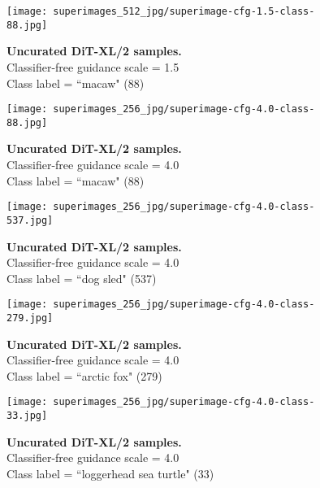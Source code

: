 \documentclass[10pt,twocolumn,letterpaper]{article}
\begin{document}
\begin{figure}\centering
\texttt{[image: superimages\_512\_jpg/superimage-cfg-1.5-class-88.jpg]}
\caption{\textbf{Uncurated  DiT-XL/2 samples.} \\Classifier-free guidance scale = 1.5\\Class label = ``macaw" (88)}\vspace{-2mm}
\label{fig:samples512_12}
\end{figure}


\clearpage
\pagestyle{fancy}
\fancyhead{}

\begin{figure}\centering
\texttt{[image: superimages\_256\_jpg/superimage-cfg-4.0-class-88.jpg]}
\caption{\textbf{Uncurated  DiT-XL/2 samples.} \\Classifier-free guidance scale = 4.0\\Class label = ``macaw" (88)}\vspace{-2mm}
\label{fig:samples1}
\end{figure}

\begin{figure}\centering
\texttt{[image: superimages\_256\_jpg/superimage-cfg-4.0-class-537.jpg]}
\caption{\textbf{Uncurated  DiT-XL/2 samples.} \\Classifier-free guidance scale = 4.0\\Class label = ``dog sled" (537)}\vspace{-2mm}
\label{fig:samples2}
\end{figure}

\clearpage
\pagestyle{fancy}
\fancyhead{}

\begin{figure}\centering
\texttt{[image: superimages\_256\_jpg/superimage-cfg-4.0-class-279.jpg]}
\caption{\textbf{Uncurated  DiT-XL/2 samples.} \\Classifier-free guidance scale = 4.0\\Class label = ``arctic fox" (279)}\vspace{-2mm}
\label{fig:samples3}
\end{figure}

\begin{figure}\centering
\texttt{[image: superimages\_256\_jpg/superimage-cfg-4.0-class-33.jpg]}
\caption{\textbf{Uncurated  DiT-XL/2 samples.} \\Classifier-free guidance scale = 4.0\\Class label = ``loggerhead sea turtle" (33)}\vspace{-2mm}
\label{fig:samples4}
\end{figure}
\end{document}
